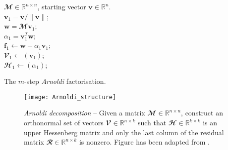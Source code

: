     \begin{algorithm}
      \begin{algorithmic}
        \REQUIRE $\mathbfcal{M} \in \mathbb{R}^{n \times n}$, starting vector $\mathbf{v} \in \mathbb{R}^n$.\\
        $\mathbf{v}_1 = \mathbf{v} / \| \mathbf{v} \|$;\\
        $\mathbf{w} = \mathbfcal{M} \mathbf{v}_1$; \\
        $\alpha_1 = \mathbf{v}_1^T \mathbf{w}$;\\
        $\mathbf{f}_1 \leftarrow \mathbf{w} - \alpha_1 \mathbf{v}_1$;\\
        $\mathbfcal{V}_1 \leftarrow \left( \mathbf{v}_1 \right)$; \\
        $\mathbfcal{H}_1 \leftarrow (\alpha_1)$;\\
        \ENDFOR
      \end{algorithmic}
      \caption{The $m$-step \emph{Arnoldi} factorisation.}
      \label{algo: Arnoldi}
    \end{algorithm}

    \begin{figure}[b]
      \centering
      \texttt{[image: Arnoldi\_structure]}
      \caption{\emph{Arnoldi decomposition} -- Given a matrix $\mathbfcal{M} \in \mathbb{R}^{n \times n}$, construct an orthonormal set of vectors $\mathbfcal{V} \in \mathbb{R}^{n \times k}$ such that $\mathbfcal{H} \in \mathbb{R}^{k \times k}$ is an upper Hessenberg matrix and only the last column of the residual matrix $\mathbfcal{R} \in \mathbb{R}^{n \times k}$ is nonzero. Figure has been adapted from \cite{book:antoulas:2005}.}
      \label{fig: numerics -- arnoldi decomposition structure}
    \end{figure}

